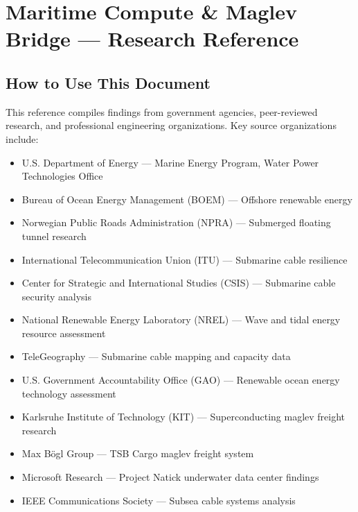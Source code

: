 \documentclass[11pt,letterpaper]{article}
\newcommand{\stageheader}[2]{%
  \noindent\colorbox{#2}{\makebox[\textwidth][l]{%
    \textcolor{white}{\bfseries\sffamily\hspace{6pt}#1\hspace{6pt}}}}%
  \vspace{0.5em}\par%
}
\begin{document}
\newpage

\stageheader{STAGE 2 --- RESEARCH REFERENCE}{secondary}

\section{Maritime Compute \& Maglev Bridge --- Research Reference}

\subsection{How to Use This Document}

This reference compiles findings from government agencies, peer-reviewed research, and professional engineering organizations. Key source organizations include:

\begin{itemize}[leftmargin=2em]
  \item U.S. Department of Energy --- Marine Energy Program, Water Power Technologies Office
  \item Bureau of Ocean Energy Management (BOEM) --- Offshore renewable energy
  \item Norwegian Public Roads Administration (NPRA) --- Submerged floating tunnel research
  \item International Telecommunication Union (ITU) --- Submarine cable resilience
  \item Center for Strategic and International Studies (CSIS) --- Submarine cable security analysis
  \item National Renewable Energy Laboratory (NREL) --- Wave and tidal energy resource assessment
  \item TeleGeography --- Submarine cable mapping and capacity data
  \item U.S. Government Accountability Office (GAO) --- Renewable ocean energy technology assessment
  \item Karlsruhe Institute of Technology (KIT) --- Superconducting maglev freight research
  \item Max Bögl Group --- TSB Cargo maglev freight system
  \item Microsoft Research --- Project Natick underwater data center findings
  \item IEEE Communications Society --- Subsea cable systems analysis
\end{itemize}
\end{document}
